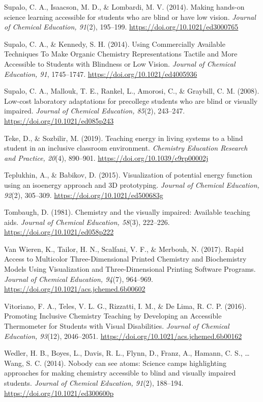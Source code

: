\documentclass[11.5pt]{sig-alternate} %
\begin{document}
Supalo, C. A., Isaacson, M. D., \& Lombardi, M. V. (2014). Making hands-on science learning accessible for students who are blind or have low vision. \textit{Journal of Chemical Education, 91}(2), 195–199. \url{https://doi.org/10.1021/ed3000765}

Supalo, C. A., \& Kennedy, S. H. (2014). Using Commercially Available Techniques To Make Organic Chemistry Representations Tactile and More Accessible to Students with Blindness or Low Vision. \textit{Journal of Chemical Education, 91}, 1745–1747. \url{https://doi.org/10.1021/ed4005936}

Supalo, C. A., Mallouk, T. E., Rankel, L., Amorosi, C., \& Graybill, C. M. (2008). Low-cost laboratory adaptations for precollege students who are blind or visually impaired. \textit{Journal of Chemical Education, 85}(2), 243–247. \url{https://doi.org/10.1021/ed085p243}

Teke, D., \& Sozbilir, M. (2019). Teaching energy in living systems to a blind student in an inclusive classroom environment. \textit{Chemistry Education Research and Practice, 20}(4), 890–901. \url{https://doi.org/10.1039/c9rp00002j}

Teplukhin, A., \& Babikov, D. (2015). Visualization of potential energy function using an isoenergy approach and 3D prototyping. \textit{Journal of Chemical Education, 92}(2), 305–309. \url{https://doi.org/10.1021/ed500683g}

Tombaugh, D. (1981). Chemistry and the visually impaired: Available teaching aids. \textit{Journal of Chemical Education, 58}(3), 222–226. \url{https://doi.org/10.1021/ed058p222}

Van Wieren, K., Tailor, H. N., Scalfani, V. F., \& Merbouh, N. (2017). Rapid Access to Multicolor Three-Dimensional Printed Chemistry and Biochemistry Models Using Visualization and Three-Dimensional Printing Software Programs. \textit{Journal of Chemical Education, 94}(7), 964–969. \url{https://doi.org/10.1021/acs.jchemed.6b00602}

Vitoriano, F. A., Teles, V. L. G., Rizzatti, I. M., \& De Lima, R. C. P. (2016). Promoting Inclusive Chemistry Teaching by Developing an Accessible Thermometer for Students with Visual Disabilities. \textit{Journal of Chemical Education, 93}(12), 2046–2051. \url{https://doi.org/10.1021/acs.jchemed.6b00162}

Wedler, H. B., Boyes, L., Davis, R. L., Flynn, D., Franz, A., Hamann, C. S., … Wang, S. C. (2014). Nobody can see atoms: Science camps highlighting approaches for making chemistry accessible to blind and visually impaired students. \textit{Journal of Chemical Education, 91}(2), 188–194. \url{https://doi.org/10.1021/ed300600p}
\end{document}
